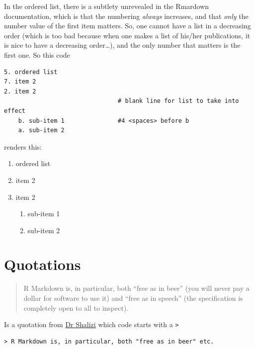 \documentclass[]{book}
\providecommand{\tightlist}{%
  \setlength{\itemsep}{0pt}\setlength{\parskip}{0pt}}
\theoremstyle{definition}
\theoremstyle{definition}
\theoremstyle{definition}
\theoremstyle{remark}
\begin{document}
In the ordered list, there is a subtlety unrevealed in the Rmardown
documentation, which is that the numbering \emph{always} increases, and
that \emph{only} the number value of the first item matters. So, one
cannot have a list in a decreasing order (which is too bad because when
one makes a list of his/her publications, it is nice to have a
decreasing order\ldots{}), and the only number that matters is the first
one. So this code

\begin{verbatim}
5. ordered list
7. item 2
2. item 2
                                # blank line for list to take into effect
    b. sub-item 1               #4 <spaces> before b
    a. sub-item 2  
\end{verbatim}

 renders this:

\begin{enumerate}
\def\labelenumi{\arabic{enumi}.}
\setcounter{enumi}{4}
\item
  ordered list
\item
  item 2
\item
  item 2

  \begin{enumerate}
  \def\labelenumii{\alph{enumii}.}
  \setcounter{enumii}{1}
  \tightlist
  \item
    sub-item 1\\
  \item
    sub-item 2
  \end{enumerate}
\end{enumerate}

\section{Quotations}\label{quotations}

\begin{quote}
R Markdown is, in particular, both ``free as in beer'' (you will never
pay a dollar for software to use it) and ``free as in speech'' (the
specification is completely open to all to inspect).
\end{quote}

Is a quotation from
\href{http://www.stat.cmu.edu/~cshalizi/rmarkdown/}{Dr Shalizi} which
code starts with a \texttt{\textgreater{}}

\begin{verbatim}
> R Markdown is, in particular, both "free as in beer" etc.
\end{verbatim}
\end{document}

